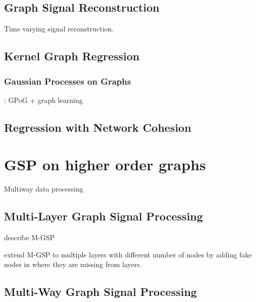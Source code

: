 \subsection{Graph Signal Reconstruction}

\cite{Qiu2017} Time varying signal reconstruction. 

\subsection{Kernel Graph Regression}

\cite{Takeda2007}

\cite{Elias2022}

\cite{Venkitaraman2019}


\subsubsection{Gaussian Processes on Graphs}

\cite{Venkitaraman2020}

\cite{Miao2022}: GPoG + graph learning

\subsection{Regression with Network Cohesion}

\cite{Le2022}

\cite{Li2019}

\section{GSP on higher order graphs}

Multiway data processing 

\cite{Smilde2004}
\cite{Kroonenberg2008}


\cite{Ji2019}

\cite{Cammoun2009}




\subsection{Multi-Layer Graph Signal Processing}

\cite{Zhang2022} describe M-GSP 

\cite{Zhang2018} extend M-GSP to multiple layers with different number of nodes by adding fake nodes in where they are missing from layers. 
 

\subsection{Multi-Way Graph Signal Processing}


